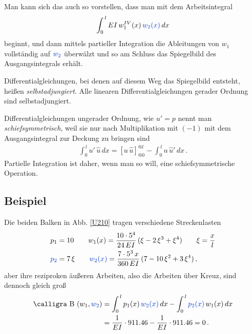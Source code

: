 Man kann sich das auch so vorstellen, dass man mit dem Arbeitsintegral
\begin{align}
\int_0^{\,l} EI\,w_1^{IV}(x)\,\textcolor{chapterTitleBlue}{w_2(x)}\,dx
\end{align}
beginnt, und dann mittels partieller Integration die Ableitungen von $w_1$ vollst\"{a}ndig auf $\textcolor{chapterTitleBlue}{w_2} $ \"{u}berw\"{a}lzt und so am Schluss das Spiegelbild des Ausgangsintegrals erh\"{a}lt.

Differentialgleichungen, bei denen auf diesem Weg das Spiegelbild entsteht, hei{\ss}en {\em selbstadjungiert\/}. Alle linearen Differentialgleichungen gerader Ordnung sind selbstadjungiert.

Differentialgleichungen ungerader Ordnung, wie $u' = p$ nennt man {\em schiefsymmetrisch\/},  weil sie nur nach Multiplikation mit $(-1)$ mit dem Ausgangsintegral zur Deckung zu bringen sind
\begin{align}\label{Eq58}
\int_0^{\,l} u'\,\hat{u}\,dx = [u\,\hat{u}]_{@0}^{@l} - \int_0^{\,l} u\,\hat{u}'\,dx\,.
\end{align}
Partielle Integration ist daher, wenn man so will, eine \glq schiefsymmetrische\grq{} Operation.

{\textcolor{sectionTitleBlue}{\subsection*{Beispiel}}}
Die beiden Balken in Abb. \ref{U210} tragen verschiedene Streckenlasten
\begin{align}
p_1 &= 10 \qquad w_1(x) = \frac{10\cdot 5^4}{24\,EI}\,(\xi - 2\,\xi^3 + \xi^4) \qquad \xi = \frac{x}{l}\\
\textcolor{chapterTitleBlue}{p_2} &= 7\,\xi \qquad \textcolor{chapterTitleBlue}{w_2(x)} = \frac{7\cdot 5^3\,x}{360\,EI}\,(7 - 10\,\xi^2 + 3\,\xi^4)\,,
\end{align}
aber ihre reziproken \"{a}u{\ss}eren Arbeiten, also die Arbeiten \glq \"{u}ber Kreuz\grq{}, sind dennoch gleich gro{\ss}
\begin{align}\label{Eq35}
\text{\normalfont\calligra B\,\,}(w_1,\textcolor{chapterTitleBlue}{w_2}) &= \int_0^{\,l} p_1(x)\,\textcolor{chapterTitleBlue}{w_2(x)}\,dx - \int_0^{\,l} \textcolor{chapterTitleBlue}{p_2(x)}\,w_1(x)\,dx\nn \\
 &= \frac{1}{EI}\cdot 911.46 - \frac{1}{EI}\cdot 911.46 = 0\,.
\end{align}

